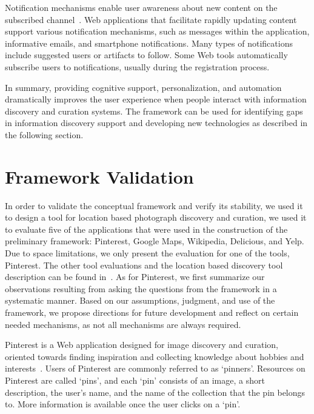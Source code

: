 \documentclass{sigchi}
\begin{document}
{{{{Notification mechanisms enable user awareness about new content on the subscribed channel~\cite{millen2005social}. Web applications that facilitate rapidly updating content support various notification mechanisms, such as messages within the application, informative emails, and smartphone notifications. Many types of notifications include suggested users or artifacts to follow. Some Web tools automatically subscribe users to notifications, usually during the registration process.
} %

In summary, providing cognitive support, personalization, and automation dramatically improves the user experience when people interact with information discovery and curation systems. The framework can be used for identifying gaps in information discovery support and developing new technologies as described in the following section.  
}

\section{Framework Validation}
\label{section:validation}
In order to validate the conceptual framework and verify its stability, we used it to design a tool for location based photograph discovery and curation, we used it to evaluate five of the applications that were used in the construction of the preliminary framework: Pinterest, Google Maps, Wikipedia, Delicious, and Yelp. Due to space limitations, we only present the evaluation for one of the tools, Pinterest. The other tool evaluations and the location based discovery tool description can be found in~\cite{voyloshnikova2015}. As for Pinterest, we first summarize our observations resulting from asking the questions from the framework in a systematic manner. Based on our assumptions, judgment, and use of the framework, we propose directions for future development and reflect on certain needed mechanisms, as not all mechanisms are always required. 

Pinterest is a Web application designed for image discovery and curation, oriented towards finding inspiration and collecting knowledge about hobbies and interests~\cite{gilbert2013need,zarro2012pinterest,ottoni2013ladies}.  Users of Pinterest are commonly referred to as `pinners'. Resources on Pinterest are called `pins', and each `pin' consists of an image, a short description, the user's name, and the name of the collection that the pin belongs to. More information is available once the user clicks on a `pin'.

}}
\end{document}
